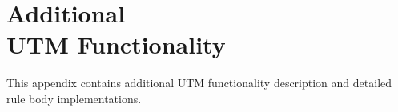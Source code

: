 \cleardoublepage

\chapter[Additional UTM Functionality]{Additional \\ UTM Functionality}
\noindent This appendix contains additional UTM functionality description and detailed rule body implementations.


